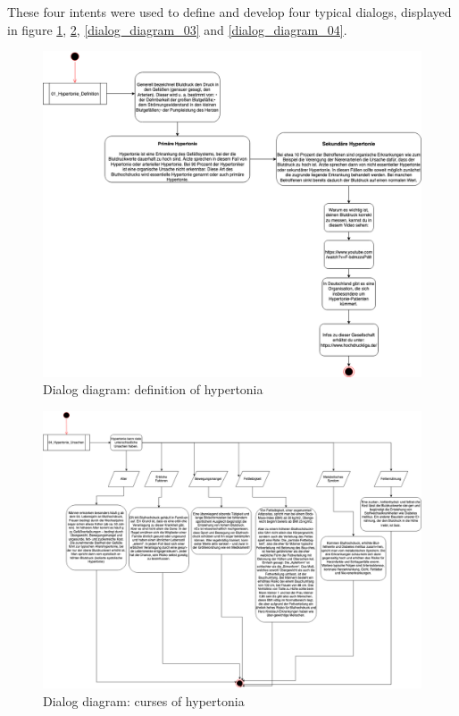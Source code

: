 These four intents were used to define and develop four typical dialogs, displayed in figure \ref{dialog_diagram_01}, \ref{dialog_diagram_02}, \ref{dialog_diagram_03} and \ref{dialog_diagram_04}.

\begin{figure}[h]
	\centering
	\includegraphics[width=1\textwidth]{images/01_Hypertonie_Definition.png}
	\caption{Dialog diagram: definition of hypertonia}
	\label{dialog_diagram_01}
\end{figure}

\begin{figure}[h]
	\centering
	\includegraphics[width=1\textwidth]{images/02_Hypertonie_Ursachen.png}
	\caption{Dialog diagram: curses of hypertonia}
	\label{dialog_diagram_02}
\end{figure}

